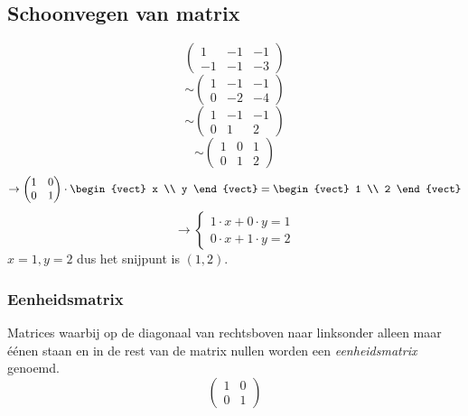 \subsection{Schoonvegen van matrix}
\[ \left(\! \begin{array}{rr|r}
	1 & -1 & -1 \\
	-1 & -1 & -3
\end{array} \!\right) \]
\[ \sim
\left(\! \begin{array}{rr|r}
	1 & -1 & -1 \\
	0 & -2 & -4
\end{array} \!\right) \]
\[ \sim \left(\! \begin{array}{rr|r}
	1 & -1 & -1 \\
	0 & 1 & 2
\end{array} \!\right) \]
\[ \sim \left(\! \begin{array}{rr|r}
	1 & 0 & 1 \\
	0 & 1 & 2
\end{array} \!\right) \]
\[ \to 
\begin{pmatrix}
	1 & 0 \\
	0 & 1
\end{pmatrix} \cdot \begin{vect} x \\ y \end{vect} = \begin{vect} 1 \\ 2 \end{vect} \]
\[ \to \left\{ \begin{array}{c}
	1 \cdot x + 0 \cdot y = 1 \\
	0 \cdot x + 1 \cdot y = 2
\end{array} \right. \]
$x=1, y=2$ dus het snijpunt is $(1, 2)$.

\subsubsection{Eenheidsmatrix}

Matrices waarbij op de diagonaal van rechtsboven naar linksonder alleen maar \'e\'enen staan en in de rest van de matrix nullen worden een \emph{eenheidsmatrix}  genoemd.
\[ \begin{pmatrix}
	1 & 0 \\
	0 & 1
\end{pmatrix} \]

